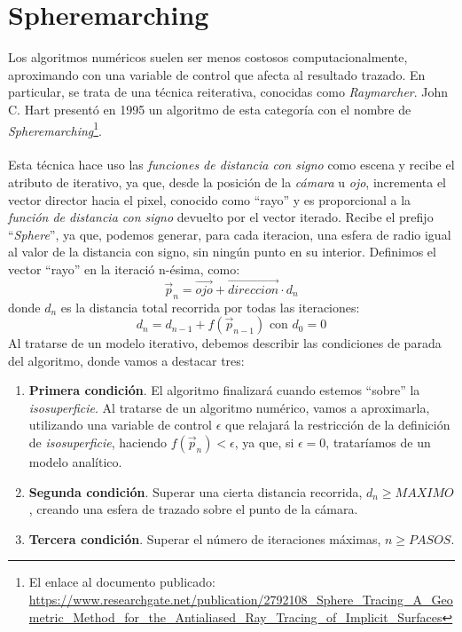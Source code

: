 \section{Spheremarching\label{sec:spheremarching}}
Los algoritmos numéricos suelen ser menos costosos computacionalmente, aproximando con una variable de control que afecta al resultado trazado. En particular, se trata de una técnica reiterativa, conocidas como \textit{Raymarcher}. John C. Hart presentó en 1995 un algoritmo de esta categoría con el nombre de  \textit{Spheremarching}\footnote{El enlace al documento publicado: \url{https://www.researchgate.net/publication/2792108_Sphere_Tracing_A_Geometric_Method_for_the_Antialiased_Ray_Tracing_of_Implicit_Surfaces}}.\\\\
Esta técnica hace uso las \textit{funciones de distancia con signo} como escena y recibe el atributo de iterativo, ya que, desde la posición de la \textit{cámara} u \textit{ojo}, incrementa el vector director hacia el pixel, conocido como \enquote{rayo} y es proporcional a la \textit{función de distancia con signo} devuelto por el vector iterado. Recibe el prefijo \enquote{\textit{Sphere}\textendash}, ya que, podemos generar, para cada iteracion, una esfera de radio igual al valor de la distancia con signo, sin ningún punto en su interior. Definimos el vector \enquote{rayo} en la iteració n-ésima, como:
\[ \Vec{p}_{n}=\Vec{ojo} + \Vec{direccion} \cdot d_{n} \]
donde \(d_{n}\) es la distancia total recorrida por todas las iteraciones:
\[d_{n}=d_{n-1} + f(\Vec{p}_{n-1})\text{ con } d_0=0\]
Al tratarse de un modelo iterativo, debemos describir las condiciones de parada del algoritmo, donde vamos a destacar tres:
\begin{enumerate}
    \item \textbf{Primera condición}. El algoritmo finalizará cuando estemos \enquote{sobre} la \textit{isosuperficie}. Al tratarse de un algoritmo numérico, vamos a aproximarla, utilizando una variable de control \(\epsilon\) que relajará la restricción de la definición de  \textit{isosuperficie}, haciendo \(f(\Vec{p}_n) < \epsilon\), ya que, si \(\epsilon = 0\), trataríamos de un modelo analítico.
    \item \textbf{Segunda condición}. Superar una cierta distancia recorrida, \(d_{n}\ge MAXIMO\), creando una esfera de trazado sobre el punto de la cámara.
    \item \textbf{Tercera condición}. Superar el número de iteraciones máximas, \(n \ge PASOS\).
\end{enumerate}
